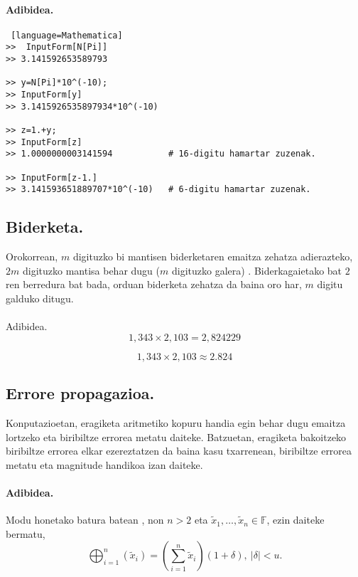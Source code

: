 \paragraph*{\textbf{Adibidea}.}

\begin{lstlisting} [language=Mathematica]
>>  InputForm[N[Pi]]
>> 3.141592653589793

>> y=N[Pi]*10^(-10);
>> InputForm[y]
>> 3.1415926535897934*10^(-10)

>> z=1.+y;
>> InputForm[z]
>> 1.0000000003141594           # 16-digitu hamartar zuzenak.

>> InputForm[z-1.]
>> 3.141593651889707*10^(-10)   # 6-digitu hamartar zuzenak.

\end{lstlisting}
 
\subsection*{Biderketa.}

Orokorrean, $m$ digituzko bi mantisen biderketaren emaitza zehatza adierazteko, $2m$ digituzko mantisa behar dugu ($m$ digituzko galera) \cite{Fukushima2001}. Biderkagaietako bat $2$ren berredura bat bada, orduan biderketa zehatza da baina oro har, $m$ digitu galduko ditugu.  

\paragraph*{} Adibidea.
\begin{equation*}
1,343 \times 2,103 = 2,824229 
\end{equation*} 

\begin{equation*}
1,343 \times 2,103 \approx 2.824
\end{equation*}    


\subsection*{Errore propagazioa.}

Konputazioetan, eragiketa aritmetiko kopuru handia egin behar dugu emaitza lortzeko eta biribiltze errorea metatu daiteke. Batzuetan, eragiketa bakoitzeko biribiltze errorea elkar ezereztatzen da baina kasu txarrenean, biribiltze errorea metatu eta magnitude handikoa izan daiteke.   

\paragraph*{\textbf{Adibidea}.} 
Modu honetako batura batean , non $n>2$ eta $\tilde x_1,\dots,\tilde x_n \in \mathbb{F}$,  ezin daiteke bermatu,  
\begin{equation*}
\bigoplus_{i=1}^{n}(\tilde x_i)=(\sum\limits_{i=1}^{n} \tilde x_i)(1+\delta), \ |\delta|<u.
\end{equation*}

